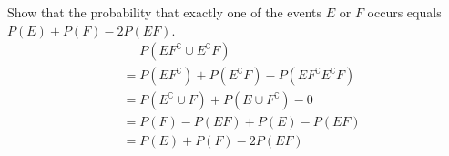 \item Show that the probability that exactly one of the events $E$ or $F$ occurs equals $P(E) + P(F) - 2P(EF)$.
\begin{align*}
    &\phantom{{}={}} P(EF^\complement  \cup E^\complement F)\\
    &= P(EF^\complement ) + P(E^\complement F) - P(EF^\complement E^\complement F)\\
    &= P(E^\complement \cup F) + P(E\cup F^\complement ) - 0\\
    &= P(F) - P(EF) + P(E) - P(EF)\\
    &= P(E) + P(F) - 2P(EF)
\end{align*}
